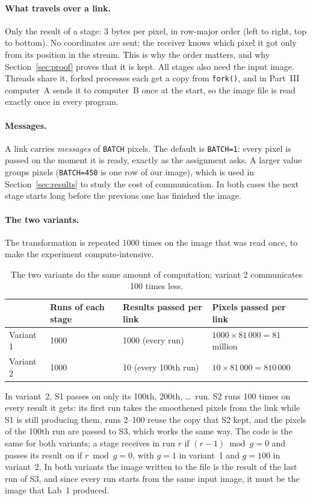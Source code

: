 \documentclass[11pt,a4paper]{article}
\begin{document}
\paragraph{What travels over a link.} Only the result of a stage: 3 bytes per pixel, in row-major
order (left to right, top to bottom). No coordinates are sent; the receiver knows which pixel it
got only from its position in the stream. This is why the order matters, and why
Section~\ref{sec:proof} proves that it is kept. All stages also need the input image. Threads share
it, forked processes each get a copy from \texttt{fork()}, and in Part~III computer~A sends it to
computer~B once at the start, so the image file is read exactly once in every program.

\paragraph{Messages.} A link carries \emph{messages} of \texttt{BATCH} pixels. The default is
\texttt{BATCH=1}: every pixel is passed on the moment it is ready, exactly as the assignment asks.
A larger value groups pixels (\texttt{BATCH=450} is one row of our image), which is used in
Section~\ref{sec:results} to study the cost of communication. In both cases the next stage starts
long before the previous one has finished the image.

\paragraph{The two variants.} The transformation is repeated 1000 times on the image that was read
once, to make the experiment compute-intensive.

\begin{table}[H]
\centering\small
\begin{tabular}{@{}llll@{}}
\toprule
& Runs of each stage & Results passed per link & Pixels passed per link \\
\midrule
Variant 1 & 1000 & 1000 (every run) & $1000\times81\,000 = 81$ million \\
Variant 2 & 1000 & 10 (every 100th run) & $10\times81\,000 = 810\,000$ \\
\bottomrule
\end{tabular}
\caption{The two variants do the same amount of computation; variant 2 communicates 100 times less.}
\label{tab:variants}
\end{table}

\noindent In variant~2, S1 passes on only its 100th, 200th, \dots\ run. S2 runs 100 times on every
result it gets: its first run takes the smoothened pixels from the link while S1 is still producing
them, runs 2--100 reuse the copy that S2 kept, and the pixels of the 100th run are passed to S3,
which works the same way. The code is the same for both variants; a stage receives in run $r$ if
$(r-1) \bmod g = 0$ and passes its result on if $r \bmod g = 0$, with $g=1$ in variant~1 and $g=100$
in variant~2. In both variants the image written to the file is the result of the last run of S3,
and since every run starts from the same input image, it must be the image that Lab~1 produced.
\end{document}
